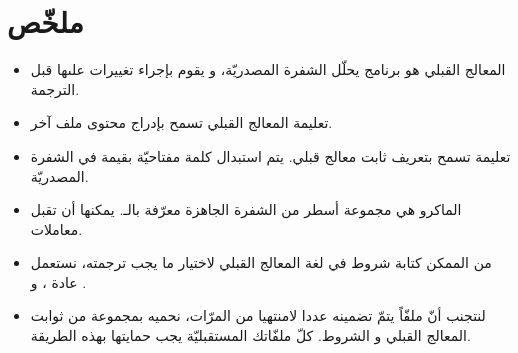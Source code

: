 \section*{ملخّص}
\begin{itemize}
  \item المعالج القبلي هو برنامج يحلّل الشفرة المصدريّة، و يقوم بإجراء تغييرات علىها قبل الترجمة.
  \item تعليمة المعالج القبلي
تسمح بإدراج محتوى ملف آخر.
  \item تعليمة
تسمح بتعريف ثابت معالج قبلي. يتم استبدال كلمة مفتاحيّة بقيمة في الشفرة المصدريّة.
  \item الماكرو هي مجموعة أسطر من الشفرة الجاهزة معرّفة بالـ.
يمكنها أن تقبل معاملات.
  \item من الممكن كتابة شروط في لغة المعالج القبلي لاختيار ما يجب ترجمته، نستعمل عادة
،
و
.
  \item لنتجنب أنّ ملفّاً
يتمّ تضمينه عددا لامنتهيا من المرّات، نحميه بمجموعة من ثوابت المعالج القبلي و الشروط. كلّ ملفّاتك
المستقبليّة يجب حمايتها بهذه الطريقة.
\end{itemize}
